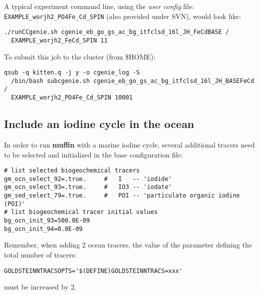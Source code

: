 \documentclass[11pt,fleqn]{book} %
\begin{document}
A typical experiment command line, using the \textit{user config} file: \texttt{EXAMPLE\_worjh2\_PO4Fe\_Cd\_SPIN} (also provided under SVN), would look like:
\vspace{-4pt}\begin{verbatim}
./runCCgenie.sh cgenie_eb_go_gs_ac_bg_itfclsd_16l_JH_FeCdBASE /
  EXAMPLE_worjh2_FeCd_SPIN 11
\end{verbatim}\vspace{-4pt}

To submit this job to the cluster (from \$HOME):
\vspace{-4pt}\begin{verbatim}
qsub -q kitten.q -j y -o cgenie_log -S
  /bin/bash subcgenie.sh cgenie_eb_go_gs_ac_bg_itfclsd_16l_JH_BASEFeCd /
  EXAMPLE_worjh2_PO4Fe_Cd_SPIN 10001
\end{verbatim}\vspace{-4pt}

%
\newpage
\subsection*{Include an iodine cycle in the ocean}
\vspace{1mm}

In order to run \textbf{muffin} with a marine iodine cycle, several additional tracers need to be selected and initialized in the base configuration file:
\vspace{-1mm}\small\begin{verbatim}
# list selected biogeochemical tracers
gm_ocn_select_92=.true.     #   I   -- 'iodide' 
gm_ocn_select_93=.true.     #   IO3 -- 'iodate' 
gm_sed_select_79=.true.     #   POI -- 'particulate organic iodine (POI)'
# list biogeochemical tracer initial values
bg_ocn_init_93=500.0E-09
bg_ocn_init_94=0.0E-09
\end{verbatim}\normalsize\vspace{-1mm}
Remember, when adding 2 ocean tracers, the value of the parameter defining the total number of tracers:
\vspace{-2mm}\small\begin{verbatim}
GOLDSTEINNTRACSOPTS='$(DEFINE)GOLDSTEINNTRACS=xxx'
\end{verbatim}\normalsize\vspace{-2mm}
must be increased by 2.
\end{document}
